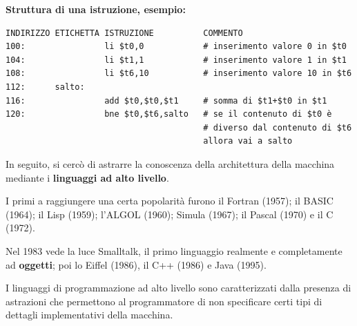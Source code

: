 \documentclass[12pt]{article}
\begin{document}
\textbf{Struttura di una istruzione, esempio:}
\begin{lstlisting}
INDIRIZZO ETICHETTA ISTRUZIONE          COMMENTO
100:                li $t0,0            # inserimento valore 0 in $t0
104:                li $t1,1            # inserimento valore 1 in $t1
108:                li $t6,10           # inserimento valore 10 in $t6
112:      salto:
116:                add $t0,$t0,$t1     # somma di $t1+$t0 in $t1
120:                bne $t0,$t6,salto   # se il contenuto di $t0 è 
                                        # diverso dal contenuto di $t6 
                                        allora vai a salto
\end{lstlisting}
\vspace{\baselineskip}
In seguito, si cercò di astrarre la conoscenza della architettura della macchina mediante i \textbf{linguaggi ad alto livello}.\par\medskip\noindent 
I primi a raggiungere una certa popolarità furono il Fortran (1957); il BASIC (1964); il Lisp (1959); l'ALGOL (1960); Simula (1967); il Pascal (1970) e il C (1972). \par\medskip\noindent 
Nel 1983 vede la luce Smalltalk, il primo linguaggio realmente e completamente ad \textbf{oggetti}; poi lo Eiffel (1986), il C++ (1986) e Java (1995).\par\medskip\noindent
I linguaggi di programmazione ad alto livello sono caratterizzati dalla presenza di astrazioni che permettono al programmatore di non specificare certi tipi di dettagli implementativi della macchina.\par\medskip\noindent
\end{document}
